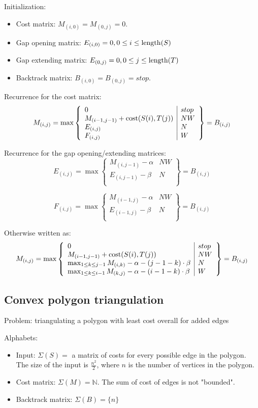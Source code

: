 \documentclass[11pt]{article}
\def\ul{\begin{itemize}}
\def\ule{\end{itemize}}
\begin{document}
Initialization:\ul
\item Cost matrix: $M_{(i,0)}=M_{(0,j)}=0$.
\item Gap opening matrix: $E_{(i,0)}= 0, 0 \le i \le {\rm length}(S)$
\item Gap extending matrix: $E_{(0,j)}= 0, 0 \le j \le {\rm length}(T)$
\item Backtrack matrix: $B_{(i,0)}=B_{(0,j)}=stop$.
\ule

Recurrence for the cost matrix:
\[M_{(i,j)}=\max\left\{\begin{array}{l|l}
	0 & stop\\
	M_{(i-1,j-1)}+{\rm cost}(S(i),T(j)) & NW\\
	E_{(i,j)} & N\\
	F_{(i,j)} & W
\end{array}\right\}=B_{(i,j)} \]

Recurrence for the gap opening/extending matrices:
\[E_{(i,j)}=\max\left\{\begin{array}{l|l}
	M_{(i, j-1)} - \alpha & NW\\
	E_{(i,j-1)} - \beta & N\\
\end{array}\right\}=B_{(i,j)} \]

\[F_{(i,j)}=\max\left\{\begin{array}{l|l}
	M_{(i-1, j)} - \alpha & NW\\
	E_{(i-1,j)} - \beta & N\\
\end{array}\right\}=B_{(i,j)} \]

Otherwise written as:
\[M_{(i,j)}=\max\left\{\begin{array}{l|l}
	0 & stop\\
	M_{(i-1,j-1)}+{\rm cost}(S(i),T(j)) & NW\\
	\max_{1 \le k \le j-1} M_{(i,k)} - \alpha - (j-1-k) \cdot \beta & N\\
	\max_{1 \le k \le i-1} M_{(k,j)} - \alpha - (i-1-k) \cdot \beta & W\\
\end{array}\right\}=B_{(i,j)} \]

\subsection{Convex polygon triangulation}
Problem: triangulating a polygon with least cost overall for added edges

Alphabets:\ul
\item Input: $\Sigma(S)= $ a matrix of costs for every possible edge in the polygon. The 
size of the input is $\frac{n^2}{2}$, where $n$ is the number of vertices in the polygon. 
\item Cost matrix: $\Sigma(M)=\mathbb{N}$. The sum of cost of edges is not "bounded".
\item Backtrack matrix: $\Sigma(B)=\{n\}$
\ule
\end{document}
